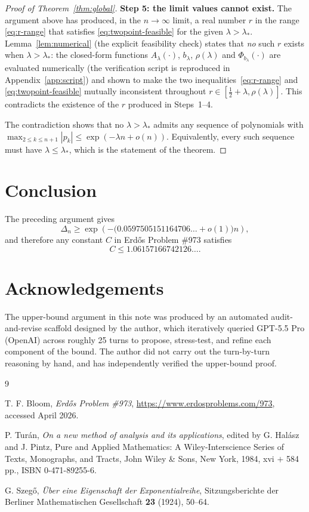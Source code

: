 \documentclass[11pt]{article}
\begin{document}
\begin{proof}[Proof of Theorem~\ref{thm:global}]
\medskip
\noindent\textbf{Step 5: the limit values cannot exist.}
The argument above has produced, in the $n\to\infty$ limit, a real number
$r$ in the range \eqref{eq:r-range} that satisfies
\eqref{eq:twopoint-feasible} for the given $\lambda>\lambda_*$.
Lemma~\ref{lem:numerical} (the explicit feasibility check) states that
\emph{no} such $r$ exists when $\lambda>\lambda_*$: the closed-form
functions $A_\lambda(\cdot)$, $b_\lambda$, $\rho(\lambda)$ and
$\Phi_{b_\lambda}(\cdot)$ are evaluated numerically (the verification
script is reproduced in Appendix~\ref{app:script}) and shown to make the
two inequalities~\eqref{eq:r-range} and \eqref{eq:twopoint-feasible}
mutually inconsistent throughout $r\in[\tfrac12+\lambda,\rho(\lambda)]$.
This contradicts the existence of the $r$ produced in Steps~1--4.

\medskip
The contradiction shows that no $\lambda>\lambda_*$ admits any sequence of
polynomials with $\max_{2\leq k\leq n+1}|p_k|\leq\exp(-\lambda n+o(n))$.
Equivalently, every such sequence must have $\lambda\leq\lambda_*$, which
is the statement of the theorem.
\end{proof}

\section{Conclusion}

The preceding argument gives
\[
        \Delta_n\geq
        \exp\!\left(-\bigl(0.0597505151164706\ldots+o(1)\bigr)n\right),
\]
and therefore any constant $C$ in Erd\H{o}s Problem \#973 satisfies
\[
        C\leq1.06157166742126\ldots .
\]

\section*{Acknowledgements}

The upper-bound argument in this note was produced by an automated
audit-and-revise scaffold designed by the author, which iteratively queried
GPT-5.5 Pro (OpenAI) across roughly 25 turns to propose, stress-test, and
refine each component of the bound.  The author did not carry out the
turn-by-turn reasoning by hand, and has independently verified the
upper-bound proof.

\begin{thebibliography}{9}

T. F. Bloom,
\emph{Erd\H{o}s Problem \#973},
\url{https://www.erdosproblems.com/973},
accessed April 2026.

P. Tur\'an,
\emph{On a new method of analysis and its applications},
edited by G. Hal\'asz and J. Pintz,
Pure and Applied Mathematics: A Wiley-Interscience Series of Texts,
Monographs, and Tracts,
John Wiley \& Sons, New York, 1984,
xvi $+$ 584 pp., ISBN 0-471-89255-6.

G. Szeg\H{o},
\emph{\"Uber eine Eigenschaft der Exponentialreihe},
Sitzungsberichte der Berliner Mathematischen Gesellschaft \textbf{23}
(1924), 50--64.

\end{thebibliography}
\end{document}
